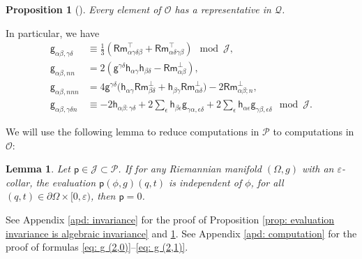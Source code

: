 \documentclass[11pt]{amsart}
\newtheorem{lemma}[theorem]{Lemma}
\newtheorem{proposition}[theorem]{Proposition}
\theoremstyle{definition}
\numberwithin{equation}{section}
\begin{document}
\begin{proposition}[{\cite[Theorem 1.1.3]{gilkeyAsymptoticFormulaeSpectral2004}}]
    Every element of $\mathcal O$ has a representative in $\mathcal Q$.
\end{proposition}

In particular, we have
\begin{align}
    \label{eq: g (2,0)}
    \mathsf g_{\alpha\beta,\gamma\delta} & \equiv \frac{1}{3}(\mathsf{Rm}^\top_{\alpha\gamma\delta\beta} + \mathsf{Rm}^\top_{\alpha\delta\gamma\beta})\mod\mathcal J, \\
    \label{eq: g (0,2)}
    \mathsf g_{\alpha\beta,nn} & = 2(\mathsf g^{\gamma\delta}\mathsf h_{\alpha\gamma}\mathsf h_{\beta\delta} - \mathsf {Rm}_{\alpha\beta}^\bot),\\
    \label{eq: g (0,3)}
    \mathsf g_{\alpha\beta,nnn} & = 4\mathsf g^{\gamma\delta}\bigl(\mathsf h_{\alpha\gamma}\mathsf {Rm}^\bot_{\beta\delta}+\mathsf h_{\beta\gamma}\mathsf {Rm}^\bot_{\alpha\delta}\bigr)-2\mathsf {Rm}^\bot_{\alpha\beta;n},\\
    \label{eq: g (2,1)}
    \mathsf g_{\alpha\beta,\gamma\delta n} & \equiv -2\mathsf h_{\alpha\beta:\gamma\delta} + 2\sum_\epsilon\mathsf h_{\beta\epsilon}\mathsf g_{\gamma\alpha,\epsilon\delta} + 2\sum_\epsilon\mathsf h_{\alpha\epsilon}\mathsf g_{\gamma\beta,\epsilon\delta}\mod\mathcal J.
\end{align}

We will use the following lemma to reduce computations in $\mathcal P$ to computations in $\mathcal O$:

\begin{lemma}
    \label{lem: independent of phi}
    Let $\mathsf p\in\mathcal J\subset\mathcal P$. If for any Riemannian manifold $(\Omega,g)$ with an $\varepsilon$-collar, the evaluation $\mathsf p(\phi,g)(q,t)$ is independent of $\phi$, for all $(q,t)\in\partial\Omega\times[0,\varepsilon)$, then $\mathsf p = 0$.
\end{lemma}

See Appendix \ref{apd: invariance} for the proof of Proposition \ref{prop: evaluation invariance is algebraic invariance} and \ref{lem: independent of phi}. See Appendix \ref{apd: computation} for the proof of formulas \eqref{eq: g (2,0)}--\eqref{eq: g (2,1)}.
\end{document}
